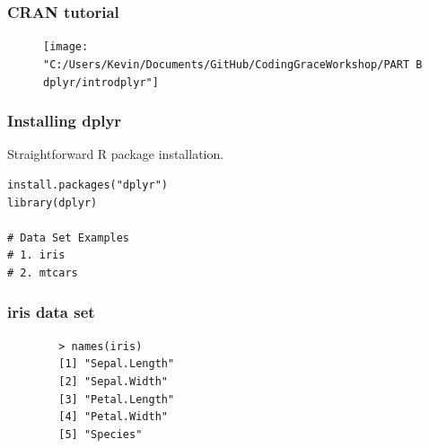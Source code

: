 \documentclass{beamer}
\begin{document}
\begin{frame}
	\frametitle{CRAN tutorial}
\begin{figure}
\centering
\texttt{[image: "C:/Users/Kevin/Documents/GitHub/CodingGraceWorkshop/PART B dplyr/introdplyr"]}

\end{figure}

\end{frame}
\begin{frame}[fragile]
\frametitle{Installing dplyr}
Straightforward R package installation.
\begin{framed}
\begin{verbatim}
install.packages("dplyr")
library(dplyr)

# Data Set Examples
# 1. iris
# 2. mtcars

\end{verbatim}
\end{framed}
\end{frame}
	
	\begin{frame}[fragile]
		\frametitle{iris data set}
\begin{framed}
		\begin{verbatim}
		> names(iris)
		[1] "Sepal.Length"
		[2] "Sepal.Width" 
		[3] "Petal.Length"
		[4] "Petal.Width" 
		[5] "Species"    
		\end{verbatim}
\end{framed}
	\end{frame}
\end{document}

